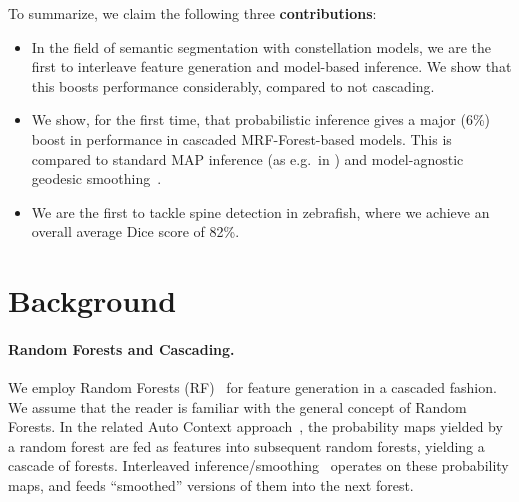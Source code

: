 \documentclass[10pt,twocolumn,letterpaper]{article}
\begin{document}
To summarize, we claim the following three {\bf contributions}:
\begin{itemize}
\item In the field of semantic segmentation with constellation models, we are the first to interleave feature generation and model-based inference. We show that this boosts performance considerably, compared to not cascading. 
\item We show, for the first time, that probabilistic inference gives a major (6\%) boost in performance in cascaded MRF-Forest-based models. This is compared to standard MAP inference (as e.g.\ in \cite{Glocker2013,SeifertAnatomicalSPIE2009,TeethMICCAI2012}) and model-agnostic geodesic smoothing~\cite{GeoForests2013,CriminisiAbdominalIPMI2011}. 
\item We are the first to tackle spine detection in zebrafish, where we achieve an overall average Dice score of 82\%.
\end{itemize}




\section{Background}

\paragraph{Random Forests and Cascading. }
We employ Random Forests (RF)~\cite{BreimanRF} for feature generation in a cascaded fashion.
%
We assume that the reader is familiar with the general concept of Random Forests. 
%
In the related Auto Context approach~\cite{AutoContext2008}, the probability maps yielded by a random forest are fed as features into subsequent random forests, yielding a cascade of forests.  
%
Interleaved inference/smoothing~\cite{DTF,RTF,UweCVPR2013,GeoForests2013} operates on these probability maps, and feeds ``smoothed'' versions of them into the next forest. 
%
\end{document}
